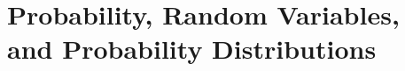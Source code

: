 \documentclass[../stats.tex]{subfiles}
\begin{document}
\chapter{Probability, Random Variables, and Probability Distributions}
\end{document}
